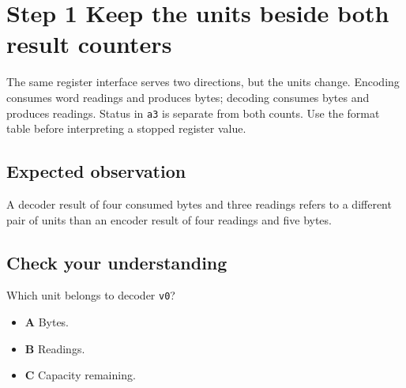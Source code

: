 \section{Step 1 Keep the units beside both result counters}\label{delta-s01}

The same register interface serves two directions, but the units change. Encoding consumes word readings and produces bytes; decoding consumes bytes and produces readings. Status in \texttt{a3} is separate from both counts. Use the format table before interpreting a stopped register value.

\subsection{Expected observation}
A decoder result of four consumed bytes and three readings refers to a different pair of units than an encoder result of four readings and five bytes.

\subsection{Check your understanding}
Which unit belongs to decoder \texttt{v0}?

\begin{itemize}
  \item \textbf{A} Bytes.
  \item \textbf{B} Readings.
  \item \textbf{C} Capacity remaining.
\end{itemize}
